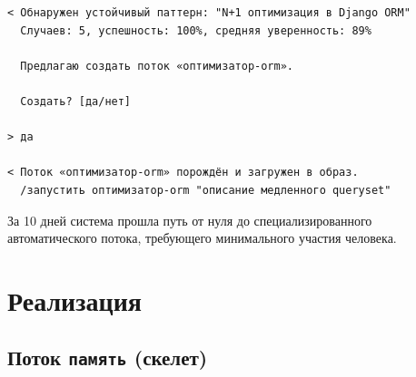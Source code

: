 \documentclass[12pt, a4paper, twoside]{article}
\begin{document}
\begin{lstlisting}[language={},numbers=none]
< Обнаружен устойчивый паттерн: "N+1 оптимизация в Django ORM"
  Случаев: 5, успешность: 100%, средняя уверенность: 89%

  Предлагаю создать поток «оптимизатор-orm».

  Создать? [да/нет]

> да

< Поток «оптимизатор-orm» порождён и загружен в образ.
  /запустить оптимизатор-orm "описание медленного queryset"
\end{lstlisting}

\begin{successbox}[title={Результат}]
За 10 дней система прошла путь от нуля до специализированного
автоматического потока, требующего минимального участия человека.
\end{successbox}

\section{Реализация}

\subsection{Поток \texttt{память} (скелет)}
\end{document}
